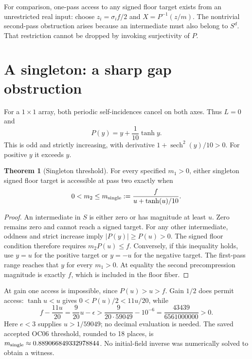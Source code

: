 \documentclass[11pt,a4paper]{article}
\theoremstyle{definition}
\newtheorem{theorem}{Theorem}[section]
\theoremstyle{remark}\newtheorem{remark}[theorem]{Remark}
\numberwithin{equation}{section}
\begin{document}
For comparison, one-pass access to any signed floor target exists from an unrestricted
real input: choose $z_i=\sigma_i f/2$ and $X=P^{-1}(z/m)$.
The nontrivial second-pass obstruction arises because an intermediate must also
belong to $S^d$. That restriction cannot be dropped by invoking surjectivity of $P$.

\section{A singleton: a sharp gap obstruction}\label{sec:singleton}
For a $1\times1$ array, both periodic self-incidences cancel on both axes.
Thus $L=0$ and
\begin{equation}\label{eq:singleP}
 P(y)=y+\frac1{10}\tanh y.
\end{equation}
This is odd and strictly increasing, with derivative
$1+\operatorname{sech}^2(y)/10>0$. For positive $y$ it exceeds $y$.

\begin{theorem}[Singleton threshold]\label{thm:singleton}
For every specified $m_1>0$, either singleton signed floor target is accessible at
pass two exactly when
\begin{equation}\label{eq:singlethreshold}
 0<m_2\leq m_{\rm single}
 :=\frac{f}{u+\tanh(u)/10}.
\end{equation}
\end{theorem}
\begin{proof}
An intermediate in $S$ is either zero or has magnitude at least $u$.
Zero remains zero and cannot reach a signed target. For any other intermediate,
oddness and strict increase imply $|P(y)|\geq P(u)>0$.
The signed floor condition therefore requires $m_2P(u)\leq f$.
Conversely, if this inequality holds, use $y=u$ for the positive target or
$y=-u$ for the negative target. The first-pass range reaches that $y$ for
every $m_1>0$. At equality the second precompression magnitude is exactly $f$,
which is included in the floor fiber.
\end{proof}

At gain one access is impossible, since $P(u)>u>f$.
Gain $1/2$ does permit access: $\tanh u<u$ gives
$0<P(u)/2<11u/20$, while
\begin{equation}\label{eq:halfbound}
 f-\frac{11u}{20}
 =\frac9{20}u-\epsilon
 >\frac9{20\cdot59049}-10^{-6}
 =\frac{43439}{6561000000}>0.
\end{equation}
Here $e<3$ supplies $u>1/59049$; no decimal evaluation is needed.
The saved accepted OC06 threshold, rounded to 18 places, is
$m_{\rm single}\approx0.889066849332978844$.
No initial-field inverse was numerically solved to obtain a witness.
\end{document}
